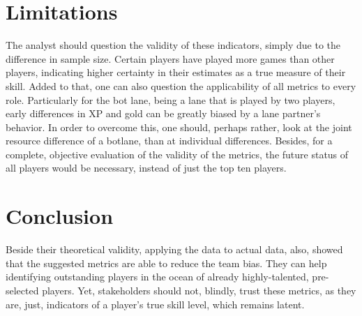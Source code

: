 \documentclass{article}
\begin{document}
\section{Limitations}
The analyst should question the validity of these indicators, simply due to the difference in sample size. Certain players have played more games than other players, indicating higher certainty in their estimates as a true measure of their skill.  \newline Added to that, one can also question the applicability of all metrics to every role. Particularly for the bot lane, being a lane that is played by two players, early differences in XP and gold can be greatly biased by a lane partner's behavior. In order to overcome this, one should, perhaps rather, look at the joint resource difference of a botlane, than at individual differences. \newline Besides, for a complete, objective evaluation of the validity of the metrics, the future status of all players would be necessary, instead of just the top ten players.

\section{Conclusion}
Beside their theoretical validity, applying the data to actual data, also, showed that the suggested metrics are able to reduce the team bias. They can help identifying outstanding players in the ocean of already highly-talented, pre-selected players. Yet, stakeholders should not, blindly, trust these metrics, as they are, just, indicators of a player's true skill level, which remains latent.












\end{document}
